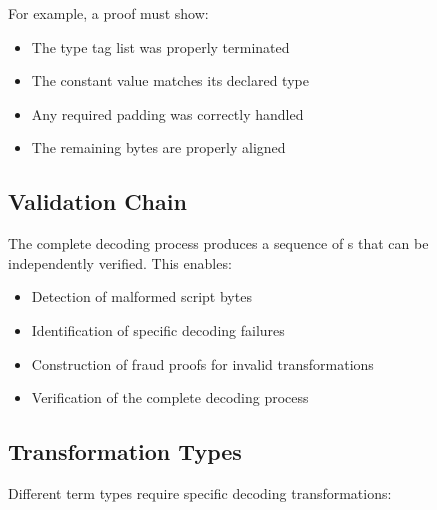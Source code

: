 \documentclass[../midgard.tex]{subfiles}
\begin{document}
For example, a  proof must show:
\begin{itemize}
    \item The type tag list was properly terminated
    \item The constant value matches its declared type
    \item Any required padding was correctly handled
    \item The remaining bytes are properly aligned
\end{itemize}

\subsection{Validation Chain}

The complete decoding process produces a sequence of s that can be independently verified. This enables:

\begin{itemize}
    \item Detection of malformed script bytes
    \item Identification of specific decoding failures
    \item Construction of fraud proofs for invalid transformations
    \item Verification of the complete decoding process
\end{itemize}

\subsection{Transformation Types}

Different term types require specific decoding transformations:
\end{document}
